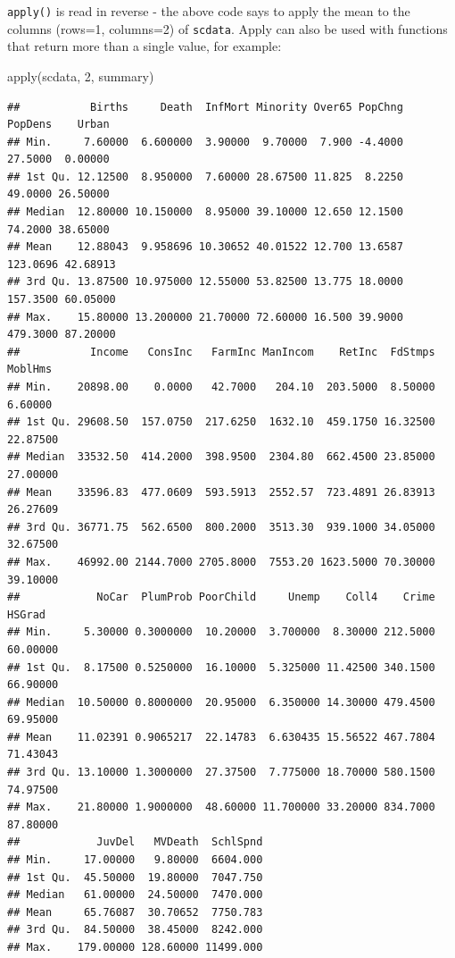 \documentclass[
]{book}
\newenvironment{Shaded}{\begin{snugshade}}{\end{snugshade}}
\newcommand{\DecValTok}[1]{\textcolor[rgb]{0.00,0.00,0.81}{#1}}
\newcommand{\FunctionTok}[1]{\textcolor[rgb]{0.00,0.00,0.00}{#1}}
\newcommand{\NormalTok}[1]{#1}
\begin{document}
\texttt{apply()} is read in reverse - the above code says to apply the mean to the columns (rows=1, columns=2) of \texttt{scdata}. Apply can also be used with functions that return more than a single value, for example:

\begin{Shaded}
\begin{Highlighting}[]
\FunctionTok{apply}\NormalTok{(scdata, }\DecValTok{2}\NormalTok{, summary)}
\end{Highlighting}
\end{Shaded}

\begin{verbatim}
##           Births     Death  InfMort Minority Over65 PopChng  PopDens    Urban
## Min.     7.60000  6.600000  3.90000  9.70000  7.900 -4.4000  27.5000  0.00000
## 1st Qu. 12.12500  8.950000  7.60000 28.67500 11.825  8.2250  49.0000 26.50000
## Median  12.80000 10.150000  8.95000 39.10000 12.650 12.1500  74.2000 38.65000
## Mean    12.88043  9.958696 10.30652 40.01522 12.700 13.6587 123.0696 42.68913
## 3rd Qu. 13.87500 10.975000 12.55000 53.82500 13.775 18.0000 157.3500 60.05000
## Max.    15.80000 13.200000 21.70000 72.60000 16.500 39.9000 479.3000 87.20000
##           Income   ConsInc   FarmInc ManIncom    RetInc  FdStmps  MoblHms
## Min.    20898.00    0.0000   42.7000   204.10  203.5000  8.50000  6.60000
## 1st Qu. 29608.50  157.0750  217.6250  1632.10  459.1750 16.32500 22.87500
## Median  33532.50  414.2000  398.9500  2304.80  662.4500 23.85000 27.00000
## Mean    33596.83  477.0609  593.5913  2552.57  723.4891 26.83913 26.27609
## 3rd Qu. 36771.75  562.6500  800.2000  3513.30  939.1000 34.05000 32.67500
## Max.    46992.00 2144.7000 2705.8000  7553.20 1623.5000 70.30000 39.10000
##            NoCar  PlumProb PoorChild     Unemp    Coll4    Crime   HSGrad
## Min.     5.30000 0.3000000  10.20000  3.700000  8.30000 212.5000 60.00000
## 1st Qu.  8.17500 0.5250000  16.10000  5.325000 11.42500 340.1500 66.90000
## Median  10.50000 0.8000000  20.95000  6.350000 14.30000 479.4500 69.95000
## Mean    11.02391 0.9065217  22.14783  6.630435 15.56522 467.7804 71.43043
## 3rd Qu. 13.10000 1.3000000  27.37500  7.775000 18.70000 580.1500 74.97500
## Max.    21.80000 1.9000000  48.60000 11.700000 33.20000 834.7000 87.80000
##            JuvDel   MVDeath  SchlSpnd
## Min.     17.00000   9.80000  6604.000
## 1st Qu.  45.50000  19.80000  7047.750
## Median   61.00000  24.50000  7470.000
## Mean     65.76087  30.70652  7750.783
## 3rd Qu.  84.50000  38.45000  8242.000
## Max.    179.00000 128.60000 11499.000
\end{verbatim}
\end{document}

